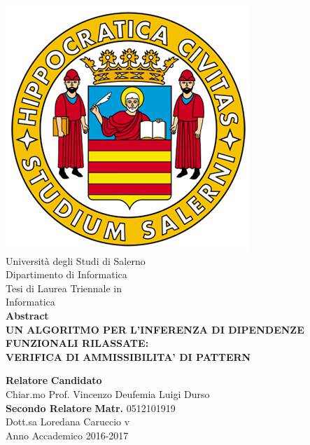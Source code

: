 \begin{center}
    \includegraphics[scale = 0.3]{../Immagini/logoUnisa.png}\\
    \vspace{1cm}
    {\Large Università degli Studi di Salerno}\\[0.2truecm]
    {\large Dipartimento di Informatica}\\
    \hrulefill
    \vfill
    {\large Tesi di Laurea Triennale in }\\[0.2truecm]
    {\Large Informatica}\\
    {\Large \textbf{Abstract}}\\
    \vfill
    {\large \bf UN ALGORITMO PER L'INFERENZA DI DIPENDENZE FUNZIONALI RILASSATE:}\\
    {\large \bf VERIFICA DI AMMISSIBILITA' DI PATTERN}
    \vfill\vfill\vfill
    
    
    {\bf Relatore} \hfill {\bf Candidato} \\
    Chiar.mo Prof. Vincenzo Deufemia \hfill Luigi Durso \\
    {\bf Secondo Relatore}
    \hfill \textbf{Matr.} 0512101919\\
    
    
    Dott.sa Loredana Caruccio  \hfill {\phantom v} \\
    \vspace{1cm}
    \hrulefill 
    \vfill
    Anno Accademico 2016-2017
\end{center}